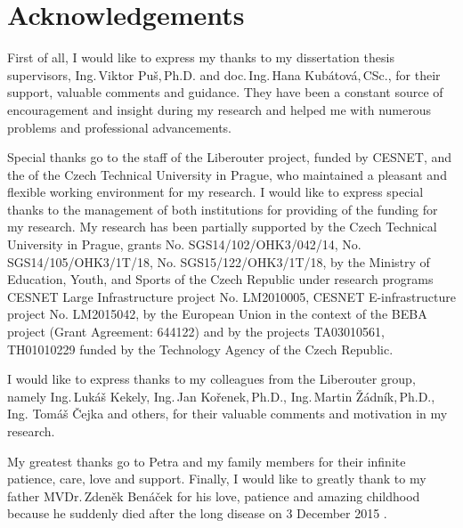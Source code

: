 \chapter*{Acknowledgements}

First of all, I would like to express my thanks to my dissertation thesis supervisors, 
Ing.\,Viktor Pu\v{s},\,Ph.D. and doc.\,Ing.\,Hana Kub\'atov\'a,\,CSc., for their support, valuable comments and guidance. 
They have been a constant source of encouragement and insight during my research and helped me with numerous problems and professional advancements.

Special thanks go to the staff of the Liberouter project, funded by CESNET, and the \Department{} of the Czech Technical University in Prague, 
who maintained a pleasant and flexible working environment for my research. 
I would like to express special thanks to the management of both institutions for providing of the funding for my research.
My research has been partially supported 
by the Czech Technical University in Prague, grants No. SGS14/102/OHK3/042/14, No. SGS14/105/OHK3/1T/18, No. SGS15/122/OHK3/1T/18,
by the Ministry of Education, Youth, and Sports of the Czech Republic under research programs CESNET Large Infrastructure project No. LM2010005,
CESNET E-infrastructure project No. LM2015042,
by the European Union in the context of the BEBA project (Grant Agreement: 644122)
and by the projects TA03010561, TH01010229 funded by the Technology Agency of the Czech Republic.

I would like to express thanks to my colleagues from the Liberouter group, namely Ing.\,Luk\'a\v{s} Kekely, Ing.\,Jan Ko\v{r}enek,\,Ph.D., 
Ing.\,Martin \v{Z}\'adn\'ik,\,Ph.D., Ing. Tom\'a\v{s} \v{C}ejka and others, 
for their valuable comments and motivation in my research.

My greatest thanks go to Petra and my family members for their infinite patience, care, love and support. 
Finally, I would like to greatly thank to my father MVDr.\,Zden\v{e}k Ben\'a\v{c}ek for his love, patience and amazing childhood because 
he suddenly died after the long disease on 3 December 2015 . 

